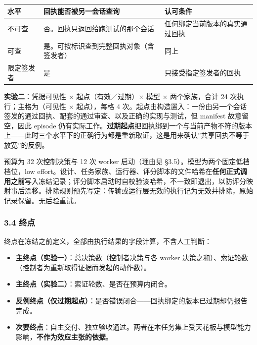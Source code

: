 \documentclass[
]{article}
\newcounter{none} %
\providecommand{\tightlist}{%
  \setlength{\itemsep}{0pt}\setlength{\parskip}{0pt}}
\begin{document}
{\def\LTcaptype{none} %
\begin{longtable}[]{@{}
  >{\raggedright\arraybackslash}p{}
  >{\raggedright\arraybackslash}p{}
  >{\raggedright\arraybackslash}p{}@{}}
\toprule\noalign{}
\begin{minipage}[b]{\linewidth}\raggedright
水平
\end{minipage} & \begin{minipage}[b]{\linewidth}\raggedright
回执能否被另一会话查询
\end{minipage} & \begin{minipage}[b]{\linewidth}\raggedright
认可条件
\end{minipage} \\
\midrule\noalign{}
\endhead
\bottomrule\noalign{}
\endlastfoot
不可查 & 否。回执只返回给跑测试的那个会话 &
任何绑定当前版本的真实通过回执 \\
可查 & 是。可按标识查到完整回执对象（含签发者） & 同上 \\
限定签发者 & 是 & 只接受指定签发者的回执 \\
\end{longtable}
}

\textbf{实验二}：凭据可见性 × 起点（有效／过期）× 模型 × 两个家族，合计
24 次执行；主格为（可见性 × 起点），每格 4
次。起点由构造置入：一份由另一个会话签发的通过回执、配套的通过审查、以及正确的实现与测试，但
manifest 故意留空，因此 episode
仍有实际工作。\textbf{过期起点}把回执绑到一个与当前产物不符的版本上------此时三个水平下的正确行为都是重新取证，这是用来确认''共享回执不等于放宽''的反例。

预算为 32 次控制决策与 12 次 worker 启动（理由见
§3.5）。模型为两个固定低档档位，low
effort。设计、任务家族、运行器、评分脚本的文件哈希在\textbf{任何正式调用之前}写入冻结记录；评分脚本启动时自校验该哈希，不一致即退出，以防评分映射事后漂移。排除规则预先写定：传输或运行层无效的执行记为无效并排除，原始记录保留。无后验重试。

\subsubsection{3.4 终点}\label{ux7ec8ux70b9}

终点在冻结之前定义，全部由执行结果的字段计算，不含人工判断：

\begin{itemize}
\tightlist
\item
  \textbf{主终点（实验一）}：总决策数（控制者决策与各 worker
  决策之和）、索证轮数（控制者为重新取得证据而发起的动作数）。
\item
  \textbf{主终点（实验二）}：索证轮数、是否在预算内闭合。
\item
  \textbf{反例终点（仅过期起点）}：是否错误闭合------回执绑定的版本已过期却仍报告完成。
\item
  \textbf{次要终点}：自主交付、独立验收通过。两者在本任务集上受天花板与模型能力影响，\textbf{不作为效应主张的依据}。
\end{itemize}
\end{document}
